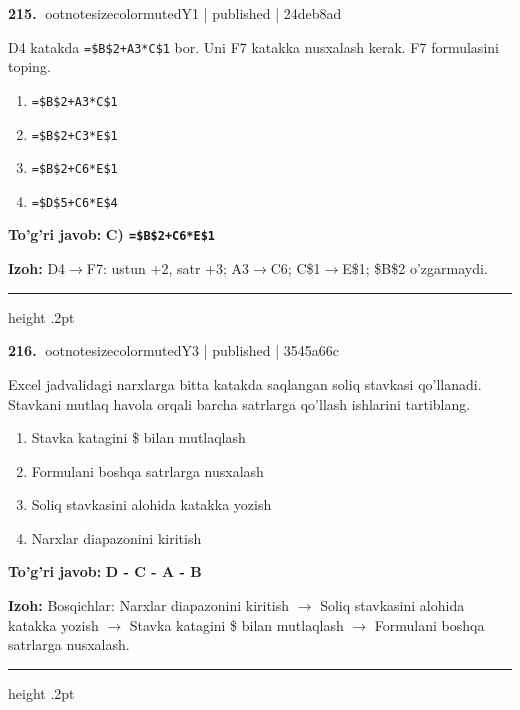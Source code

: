 \documentclass[10pt,a4paper]{article}
\begin{document}
\textbf{\color{ink}215.} {ootnotesizecolor{muted}Y1 | published | 24deb8ad}
\par
D4 katakda \texttt{=\$B\$2+A3*C\$1} bor. Uni F7 katakka nusxalash kerak. F7 formulasini toping.
\begin{enumerate}[label=\Alph*),leftmargin=9mm]
\item \texttt{=\$B\$2+A3*C\$1}
\item \texttt{=\$B\$2+C3*E\$1}
\item \texttt{=\$B\$2+C6*E\$1}
\item \texttt{=\$D\$5+C6*E\$4}
\end{enumerate}
\begin{tcolorbox}[enhanced,breakable,colback=teal!4,colframe=teal!55!black,boxrule=0.45pt,arc=1.2mm,left=2.8mm,right=2.8mm,top=2mm,bottom=2mm]
\textbf{\color{teal}To'g'ri javob:} \textbf{C) \texttt{=\$B\$2+C6*E\$1}}
\par\smallskip
\textbf{Izoh:} D4\ensuremath{\rightarrow}F7: ustun +2, satr +3; A3\ensuremath{\rightarrow}C6; C\$1\ensuremath{\rightarrow}E\$1; \$B\$2 o'zgarmaydi.
\end{tcolorbox}
\vspace{2mm}\hrule height .2pt\vspace{2mm}

\textbf{\color{ink}216.} {ootnotesizecolor{muted}Y3 | published | 3545a66c}
\par
Excel jadvalidagi narxlarga bitta katakda saqlangan soliq stavkasi qo'llanadi. Stavkani mutlaq havola orqali barcha satrlarga qo'llash ishlarini tartiblang.
\begin{enumerate}[label=\Alph*),leftmargin=9mm]
\item Stavka katagini \$ bilan mutlaqlash
\item Formulani boshqa satrlarga nusxalash
\item Soliq stavkasini alohida katakka yozish
\item Narxlar diapazonini kiritish
\end{enumerate}
\begin{tcolorbox}[enhanced,breakable,colback=teal!4,colframe=teal!55!black,boxrule=0.45pt,arc=1.2mm,left=2.8mm,right=2.8mm,top=2mm,bottom=2mm]
\textbf{\color{teal}To'g'ri javob:} \textbf{D - C - A - B}
\par\smallskip
\textbf{Izoh:} Bosqichlar: Narxlar diapazonini kiritish \ensuremath{\rightarrow} Soliq stavkasini alohida katakka yozish \ensuremath{\rightarrow} Stavka katagini \$ bilan mutlaqlash \ensuremath{\rightarrow} Formulani boshqa satrlarga nusxalash.
\end{tcolorbox}
\vspace{2mm}\hrule height .2pt\vspace{2mm}
\end{document}
